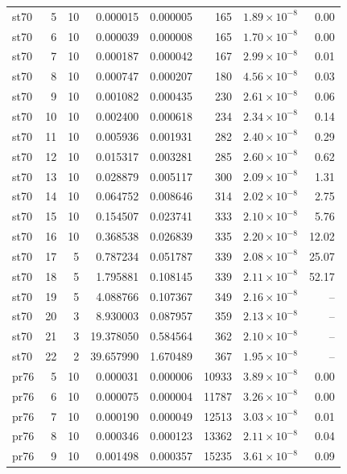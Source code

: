 \begin{table}[htbp]
\begin{tabular}{lrrrrrrr}
st70 & 5 & 10 & 0.000015 & 0.000005 & 165 & $1.89\times 10^{-8}$ & 0.00 \\
st70 & 6 & 10 & 0.000039 & 0.000008 & 165 & $1.70\times 10^{-8}$ & 0.00 \\
st70 & 7 & 10 & 0.000187 & 0.000042 & 167 & $2.99\times 10^{-8}$ & 0.01 \\
st70 & 8 & 10 & 0.000747 & 0.000207 & 180 & $4.56\times 10^{-8}$ & 0.03 \\
st70 & 9 & 10 & 0.001082 & 0.000435 & 230 & $2.61\times 10^{-8}$ & 0.06 \\
st70 & 10 & 10 & 0.002400 & 0.000618 & 234 & $2.34\times 10^{-8}$ & 0.14 \\
st70 & 11 & 10 & 0.005936 & 0.001931 & 282 & $2.40\times 10^{-8}$ & 0.29 \\
st70 & 12 & 10 & 0.015317 & 0.003281 & 285 & $2.60\times 10^{-8}$ & 0.62 \\
st70 & 13 & 10 & 0.028879 & 0.005117 & 300 & $2.09\times 10^{-8}$ & 1.31 \\
st70 & 14 & 10 & 0.064752 & 0.008646 & 314 & $2.02\times 10^{-8}$ & 2.75 \\
st70 & 15 & 10 & 0.154507 & 0.023741 & 333 & $2.10\times 10^{-8}$ & 5.76 \\
st70 & 16 & 10 & 0.368538 & 0.026839 & 335 & $2.20\times 10^{-8}$ & 12.02 \\
st70 & 17 & 5 & 0.787234 & 0.051787 & 339 & $2.08\times 10^{-8}$ & 25.07 \\
st70 & 18 & 5 & 1.795881 & 0.108145 & 339 & $2.11\times 10^{-8}$ & 52.17 \\
st70 & 19 & 5 & 4.088766 & 0.107367 & 349 & $2.16\times 10^{-8}$ & -- \\
st70 & 20 & 3 & 8.930003 & 0.087957 & 359 & $2.13\times 10^{-8}$ & -- \\
st70 & 21 & 3 & 19.378050 & 0.584564 & 362 & $2.10\times 10^{-8}$ & -- \\
st70 & 22 & 2 & 39.657990 & 1.670489 & 367 & $1.95\times 10^{-8}$ & -- \\
pr76 & 5 & 10 & 0.000031 & 0.000006 & 10933 & $3.89\times 10^{-8}$ & 0.00 \\
pr76 & 6 & 10 & 0.000075 & 0.000004 & 11787 & $3.26\times 10^{-8}$ & 0.00 \\
pr76 & 7 & 10 & 0.000190 & 0.000049 & 12513 & $3.03\times 10^{-8}$ & 0.01 \\
pr76 & 8 & 10 & 0.000346 & 0.000123 & 13362 & $2.11\times 10^{-8}$ & 0.04 \\
pr76 & 9 & 10 & 0.001498 & 0.000357 & 15235 & $3.61\times 10^{-8}$ & 0.09 \\

\end{tabular}
\end{table}
